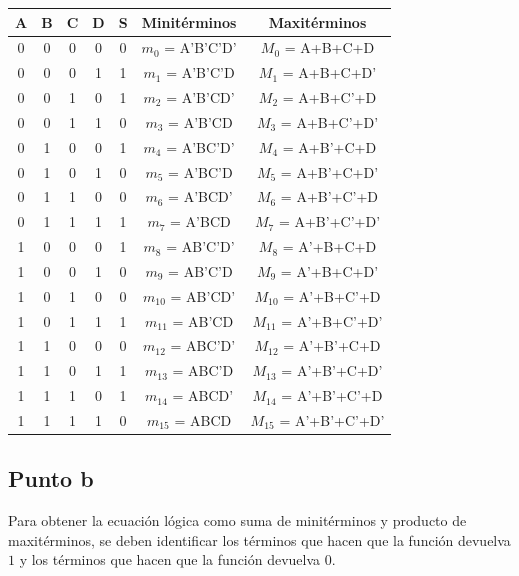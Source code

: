 \documentclass{article}
\begin{document}
\begin{table}[h]
    \centering
    \begin{tabular}{cccc|c|c|c}
        \toprule
        \textbf{A} & \textbf{B} & \textbf{C} & \textbf{D} & \textbf{S} & \textbf{Minitérminos} & \textbf{Maxitérminos}\\
        \midrule
        0 & 0 & 0 & 0 & 0 & $m_0$ = A'B'C'D' & $M_0$ = A+B+C+D\\
        0 & 0 & 0 & 1 & 1 & $m_1$ = A'B'C'D & $M_1$ = A+B+C+D'\\
        0 & 0 & 1 & 0 & 1 & $m_2$ = A'B'CD' & $M_2$ = A+B+C'+D\\
        0 & 0 & 1 & 1 & 0 & $m_3$ = A'B'CD & $M_3$ = A+B+C'+D'\\
        0 & 1 & 0 & 0 & 1 & $m_4$ = A'BC'D' & $M_4$ = A+B'+C+D\\
        0 & 1 & 0 & 1 & 0 & $m_5$ = A'BC'D & $M_5$ = A+B'+C+D'\\
        0 & 1 & 1 & 0 & 0 & $m_6$ = A'BCD' & $M_6$ = A+B'+C'+D\\
        0 & 1 & 1 & 1 & 1 & $m_7$ = A'BCD & $M_7$ = A+B'+C'+D'\\
        1 & 0 & 0 & 0 & 1 & $m_8$ = AB'C'D' & $M_8$ = A'+B+C+D\\
        1 & 0 & 0 & 1 & 0 & $m_9$ = AB'C'D & $M_9$ = A'+B+C+D'\\
        1 & 0 & 1 & 0 & 0 & $m_{10}$ = AB'CD' & $M_{10}$ = A'+B+C'+D\\
        1 & 0 & 1 & 1 & 1 & $m_{11}$ = AB'CD & $M_{11}$ = A'+B+C'+D'\\
        1 & 1 & 0 & 0 & 0 & $m_{12}$ = ABC'D' & $M_{12}$ = A'+B'+C+D\\
        1 & 1 & 0 & 1 & 1 & $m_{13}$ = ABC'D & $M_{13}$ = A'+B'+C+D'\\
        1 & 1 & 1 & 0 & 1 & $m_{14}$ = ABCD' & $M_{14}$ = A'+B'+C'+D\\
        1 & 1 & 1 & 1 & 0 & $m_{15}$ = ABCD & $M_{15}$ = A'+B'+C'+D'\\
        \bottomrule
    \end{tabular}
\end{table}

\subsection*{Punto b}
Para obtener la ecuación lógica como suma de minitérminos y producto de maxitérminos, se deben identificar los términos que hacen que la función devuelva $1$ y los términos que hacen que la función devuelva $0$.
\end{document}
